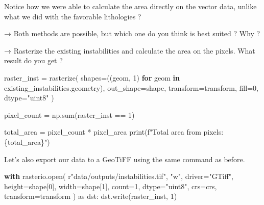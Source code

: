 \documentclass[
  letterpaper,
  DIV=11,
  numbers=noendperiod]{scrartcl}
\newenvironment{Shaded}{\begin{snugshade}}{\end{snugshade}}
\newcommand{\BuiltInTok}[1]{\textcolor[rgb]{0.00,0.23,0.31}{#1}}
\newcommand{\ControlFlowTok}[1]{\textcolor[rgb]{0.00,0.23,0.31}{\textbf{#1}}}
\newcommand{\DecValTok}[1]{\textcolor[rgb]{0.68,0.00,0.00}{#1}}
\newcommand{\ImportTok}[1]{\textcolor[rgb]{0.00,0.46,0.62}{#1}}
\newcommand{\KeywordTok}[1]{\textcolor[rgb]{0.00,0.23,0.31}{\textbf{#1}}}
\newcommand{\NormalTok}[1]{\textcolor[rgb]{0.00,0.23,0.31}{#1}}
\newcommand{\OperatorTok}[1]{\textcolor[rgb]{0.37,0.37,0.37}{#1}}
\newcommand{\SpecialCharTok}[1]{\textcolor[rgb]{0.37,0.37,0.37}{#1}}
\newcommand{\SpecialStringTok}[1]{\textcolor[rgb]{0.13,0.47,0.30}{#1}}
\newcommand{\StringTok}[1]{\textcolor[rgb]{0.13,0.47,0.30}{#1}}
\newcommand{\VerbatimStringTok}[1]{\textcolor[rgb]{0.13,0.47,0.30}{#1}}
\begin{document}
Notice how we were able to calculate the area directly on the vector
data, unlike what we did with the favorable lithologies ?

→ Both methods are possible, but which one do you think is best suited ?
Why ?

→ Rasterize the existing instabilities and calculate the area on the
pixels. What result do you get ?

\begin{Shaded}
\begin{Highlighting}[]
\NormalTok{raster\_inst }\OperatorTok{=}\NormalTok{ rasterize(}
\NormalTok{    shapes}\OperatorTok{=}\NormalTok{((geom, }\DecValTok{1}\NormalTok{) }\ControlFlowTok{for}\NormalTok{ geom }\KeywordTok{in}\NormalTok{ existing\_instabilities.geometry),}
\NormalTok{    out\_shape}\OperatorTok{=}\NormalTok{shape,}
\NormalTok{    transform}\OperatorTok{=}\NormalTok{transform,}
\NormalTok{    fill}\OperatorTok{=}\DecValTok{0}\NormalTok{,}
\NormalTok{    dtype}\OperatorTok{=}\StringTok{"uint8"}
\NormalTok{)}

\NormalTok{pixel\_count }\OperatorTok{=}\NormalTok{ np.}\BuiltInTok{sum}\NormalTok{(raster\_inst }\OperatorTok{==} \DecValTok{1}\NormalTok{)}

\NormalTok{total\_area }\OperatorTok{=}\NormalTok{ pixel\_count }\OperatorTok{*}\NormalTok{ pixel\_area}
\BuiltInTok{print}\NormalTok{(}\SpecialStringTok{f"Total area from pixels: }\SpecialCharTok{\{}\NormalTok{total\_area}\SpecialCharTok{\}}\SpecialStringTok{"}\NormalTok{)}
\end{Highlighting}
\end{Shaded}

Let's also export our data to a GeoTiFF using the same command as
before.

\begin{Shaded}
\begin{Highlighting}[]
\ControlFlowTok{with}\NormalTok{ rasterio.}\BuiltInTok{open}\NormalTok{(}
    \VerbatimStringTok{r"data/outputs/instabilities}\DecValTok{.}\VerbatimStringTok{tif"}\NormalTok{, }\StringTok{"w"}\NormalTok{,}
\NormalTok{    driver}\OperatorTok{=}\StringTok{"GTiff"}\NormalTok{,}
\NormalTok{    height}\OperatorTok{=}\NormalTok{shape[}\DecValTok{0}\NormalTok{], width}\OperatorTok{=}\NormalTok{shape[}\DecValTok{1}\NormalTok{],}
\NormalTok{    count}\OperatorTok{=}\DecValTok{1}\NormalTok{, dtype}\OperatorTok{=}\StringTok{"uint8"}\NormalTok{,}
\NormalTok{    crs}\OperatorTok{=}\NormalTok{crs, transform}\OperatorTok{=}\NormalTok{transform}
\NormalTok{) }\ImportTok{as}\NormalTok{ dst:}
\NormalTok{    dst.write(raster\_inst, }\DecValTok{1}\NormalTok{)}
\end{Highlighting}
\end{Shaded}
\end{document}

